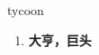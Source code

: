 
\begin{frame}
{\huge tycoon}
\begin{center}
\begin{enumerate}\Large
  \item \textbf{大亨，巨头}
\end{enumerate}
\end{center}
\end{frame}
